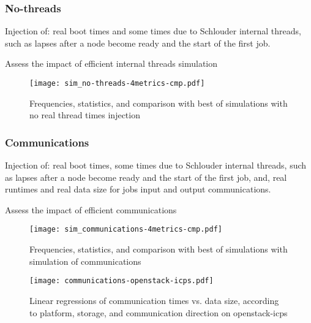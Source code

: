 \documentclass[a4paper,10pt]{article}
\newcommand\vrpath{../../lab/setup/simschlouder/validation-results/}
\begin{document}
\subsubsection{No-threads}

Injection of: real boot times and some times due to Schlouder internal threads, 
such as lapses after a node become ready and the start of the first job.

Assess the impact of efficient internal threads simulation

\begin{figure}
  \centering
  \texttt{[image: sim\_no-threads-4metrics-cmp.pdf]}
  
  

  

  
    
  \caption{Frequencies, statistics, and comparison with best of simulations with no real thread times
  injection}
\end{figure} 



\subsubsection{Communications}

Injection of: real boot times, some times due to Schlouder internal threads, 
such as lapses after a node become ready and the start of the first job, 
and, real runtimes and real data size for jobs input and output communications.

Assess the impact of efficient communications 

\begin{figure}
  \centering
  \texttt{[image: sim\_communications-4metrics-cmp.pdf]}
  
  

  

  

  \caption{Frequencies, statistics, and comparison with best of simulations with simulation of communications}
\end{figure} 

\begin{figure}
  \centering
  \texttt{[image: communications-openstack-icps.pdf]}
  
  \caption{Linear regressions of communication times vs. data size, 
    according to platform, storage, and communication direction on openstack-icps}
\end{figure} 
\end{document}
